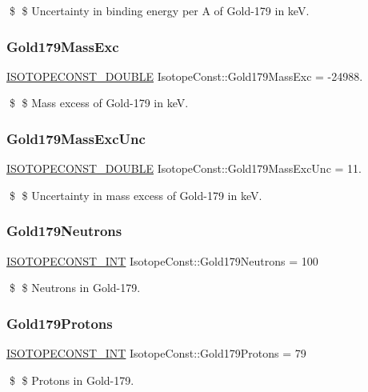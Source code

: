 \$ \$ Uncertainty in binding energy per A of Gold-\/179 in keV. \mbox{\label{group___isotope_const-_gold-_au179_gafb3329f900163d4ac890ec32ee9acad0}} 
\subsubsection{\texorpdfstring{Gold179\+Mass\+Exc}{Gold179MassExc}}
{\footnotesize\ttfamily \mbox{\hyperlink{group___isotope_const-_macros_ga8f45a7272ce02c0b4c65c44636ed719a}{I\+S\+O\+T\+O\+P\+E\+C\+O\+N\+S\+T\+\_\+\+D\+O\+U\+B\+LE}} Isotope\+Const\+::\+Gold179\+Mass\+Exc = -\/24988.}

\$ \$ Mass excess of Gold-\/179 in keV. \mbox{\label{group___isotope_const-_gold-_au179_ga5ed0309e59f6d2b5bc7d51b85e12d5bf}} 
\subsubsection{\texorpdfstring{Gold179\+Mass\+Exc\+Unc}{Gold179MassExcUnc}}
{\footnotesize\ttfamily \mbox{\hyperlink{group___isotope_const-_macros_ga8f45a7272ce02c0b4c65c44636ed719a}{I\+S\+O\+T\+O\+P\+E\+C\+O\+N\+S\+T\+\_\+\+D\+O\+U\+B\+LE}} Isotope\+Const\+::\+Gold179\+Mass\+Exc\+Unc = 11.}

\$ \$ Uncertainty in mass excess of Gold-\/179 in keV. \mbox{\label{group___isotope_const-_gold-_au179_ga56ef2d4d51bfe81285464b4bb1ebaec4}} 
\subsubsection{\texorpdfstring{Gold179\+Neutrons}{Gold179Neutrons}}
{\footnotesize\ttfamily \mbox{\hyperlink{group___isotope_const-_macros_ga5f18360b3e99483a35c32d789e62621c}{I\+S\+O\+T\+O\+P\+E\+C\+O\+N\+S\+T\+\_\+\+I\+NT}} Isotope\+Const\+::\+Gold179\+Neutrons = 100}

\$ \$ Neutrons in Gold-\/179. \mbox{\label{group___isotope_const-_gold-_au179_ga7dcda9563f20b4f582ef379cdea0fa9c}} 
\subsubsection{\texorpdfstring{Gold179\+Protons}{Gold179Protons}}
{\footnotesize\ttfamily \mbox{\hyperlink{group___isotope_const-_macros_ga5f18360b3e99483a35c32d789e62621c}{I\+S\+O\+T\+O\+P\+E\+C\+O\+N\+S\+T\+\_\+\+I\+NT}} Isotope\+Const\+::\+Gold179\+Protons = 79}

\$ \$ Protons in Gold-\/179. 